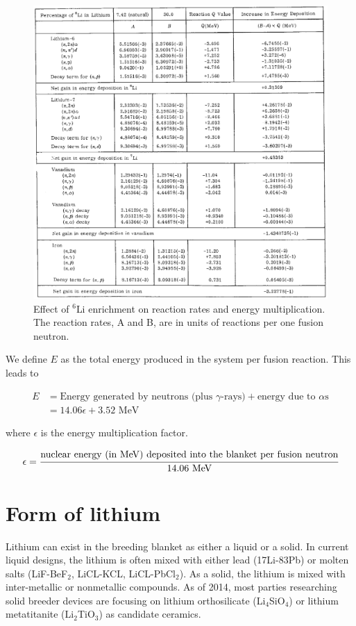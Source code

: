 \documentclass[11pt]{report} %
\begin{document}
\begin{figure}[hb!]
\centering
\includegraphics[width=\textwidth]{../images/enrichment_energy_multiplication.eps} 
\caption{Effect of $^6$Li enrichment on reaction rates and energy multiplication. The reaction rates, A and B, are in units of reactions per one fusion neutron.}
\label{fig:enrichment_energy_multiplication}
\end{figure}

We define $E$ as the total energy produced in the system per fusion reaction. This leads to

\begin{align}
E &= \text{Energy generated by neutrons (plus $\gamma$-rays)} + \text{energy due to $\alpha$s} \nonumber\\
& = 14.06 \epsilon + 3.52 \text{ MeV}
\end{align}

where $\epsilon$ is the energy multiplication factor.

\begin{equation}
\epsilon = \cfrac{\text{nuclear energy (in MeV) deposited into the blanket per fusion neutron}}{14.06~\text{MeV}}
\end{equation}

\section{Form of lithium}
Lithium can exist in the breeding blanket as either a liquid or a solid. In current liquid designs, the lithium is often mixed with either lead (17Li-83Pb) or molten salts (LiF-BeF$_2$, LiCL-KCL, LiCL-PbCl$_2$). As a solid, the lithium is mixed with inter-metallic or nonmetallic compounds. As of 2014, most parties researching solid breeder devices are focusing on lithium orthosilicate (Li$_4$SiO$_4$) or lithium metatitanite (Li$_2$TiO$_3$) as candidate ceramics.
\end{document}
